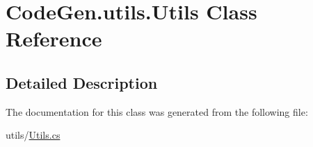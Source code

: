 \hypertarget{classCodeGen_1_1utils_1_1Utils}{}\section{Code\+Gen.\+utils.\+Utils Class Reference}
\label{classCodeGen_1_1utils_1_1Utils}


 




\subsection{Detailed Description}




The documentation for this class was generated from the following file\+:\begin{DoxyCompactItemize}
\item 
utils/\mbox{\hyperlink{Utils_8cs}{Utils.\+cs}}\end{DoxyCompactItemize}

